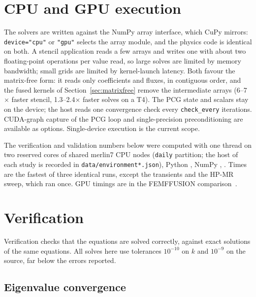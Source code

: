 \documentclass[a4paper,10pt]{article}
\newcommand{\code}[1]{\texttt{#1}}
\begin{document}
\section{CPU and GPU execution}

The solvers are written against the NumPy array interface, which CuPy mirrors:
\code{device="cpu"} or \code{"gpu"} selects the array module, and the physics code
is identical on both. A stencil application reads a few arrays and writes one
with about two floating-point operations per value read, so large solves are
limited by memory bandwidth; small grids are limited by kernel-launch latency.
Both favour the matrix-free form: it reads only coefficients and fluxes, in
contiguous order, and the fused kernels of Section~\ref{sec:matrixfree} remove
the intermediate arrays (6--7$\times$ faster stencil, 1.3--2.4$\times$ faster solves
on a T4). The PCG state and scalars stay on the device; the host reads one
convergence check every \code{check\_every} iterations. CUDA-graph capture of the
PCG loop and single-precision preconditioning are available as options.
Single-device execution is the current scope.

The verification and validation numbers below were computed with one thread on
two reserved cores of shared merlin7 CPU nodes (\code{daily} partition; the host
of each study is recorded in \code{data/environment*.json}), Python \runPython,
NumPy \runNumpy, \runDate. Times are the fastest of three identical runs, except the
transients and the HP-MR sweep, which ran once. GPU timings are in the
FEMFFUSION comparison~\cite{garnetfemffusion}.

\section{Verification}
\label{sec:verification}

Verification checks that the equations are solved correctly, against exact
solutions of the same equations. All solves here use tolerances $10^{-10}$ on $k$
and $10^{-9}$ on the source, far below the errors reported.

\subsection{Eigenvalue convergence}
\end{document}
